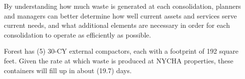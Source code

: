 
    By understanding how much waste is generated at each consolidation, planners and managers
    can better determine how well current assets and services serve current needs, and what additional 
    elements are necessary in order for each consolidation to operate as efficiently as possible. 

    Forest has (5) 30-CY external compactors, each with a footprint of 192 square feet. Given the rate at which waste is produced at NYCHA properties, these containers will fill
    up in about (19.7) days.